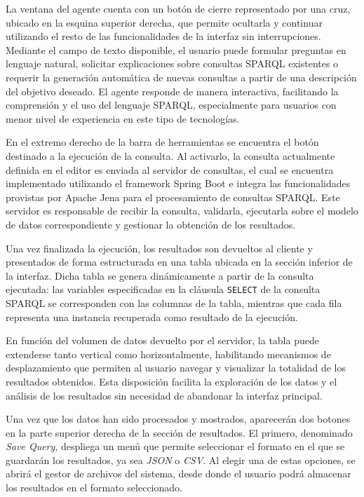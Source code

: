 \documentclass{article}
\begin{document}
La ventana del agente cuenta con un botón de cierre representado por una cruz, ubicado en la esquina superior derecha, que permite ocultarla y continuar utilizando el resto de las funcionalidades de la interfaz sin interrupciones. Mediante el campo de texto disponible, el usuario puede formular preguntas en lenguaje natural, solicitar explicaciones sobre consultas SPARQL existentes o requerir la generación automática de nuevas consultas a partir de una descripción del objetivo deseado. El agente responde de manera interactiva, facilitando la comprensión y el uso del lenguaje SPARQL, especialmente para usuarios con menor nivel de experiencia en este tipo de tecnologías.

En el extremo derecho de la barra de herramientas se encuentra el botón destinado a la ejecución de la consulta. Al activarlo, la consulta actualmente definida en el editor es enviada al servidor de consultas, el cual se encuentra implementado utilizando el framework Spring Boot e integra las funcionalidades provistas por Apache Jena para el procesamiento de consultas SPARQL. Este servidor es responsable de recibir la consulta, validarla, ejecutarla sobre el modelo de datos correspondiente y gestionar la obtención de los resultados.

Una vez finalizada la ejecución, los resultados son devueltos al cliente y presentados de forma estructurada en una tabla ubicada en la sección inferior de la interfaz. Dicha tabla se genera dinámicamente a partir de la consulta ejecutada: las variables especificadas en la cláusula \texttt{SELECT} de la consulta SPARQL se corresponden con las columnas de la tabla, mientras que cada fila representa una instancia recuperada como resultado de la ejecución.

En función del volumen de datos devuelto por el servidor, la tabla puede extenderse tanto vertical como horizontalmente, habilitando mecanismos de desplazamiento que permiten al usuario navegar y visualizar la totalidad de los resultados obtenidos. Esta disposición facilita la exploración de los datos y el análisis de los resultados sin necesidad de abandonar la interfaz principal.

Una vez que los datos han sido procesados y mostrados, aparecerán dos botones en la parte superior derecha de la sección de resultados. El primero, denominado \textit{Save Query}, despliega un menú que permite seleccionar el formato en el que se guardarán los resultados, ya sea \textit{JSON} o \textit{CSV}. Al elegir una de estas opciones, se abrirá el gestor de archivos del sistema, desde donde el usuario podrá almacenar los resultados en el formato seleccionado.
\end{document}
